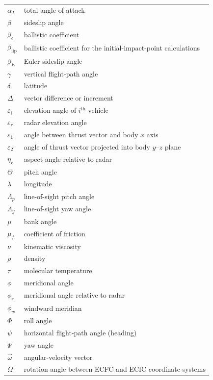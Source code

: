 \begin{longtable}{@{}>{\raggedleft\arraybackslash}p{}p{}@{}}
$\alpha_T$ & total angle of attack \\
$\beta$ & sideslip angle \\
$\beta_c$ & ballistic coefficient \\
$\beta_{\mathrm{iip}}$ & ballistic coefficient for the initial-impact-point calculations \\
$\beta_E$ & Euler sideslip angle \\
$\gamma$ & vertical flight-path angle \\
$\delta$ & latitude \\
$\Delta$ & vector difference or increment \\
$\varepsilon_i$ & elevation angle of $i^{\mathrm{th}}$ vehicle \\
$\varepsilon_r$ & radar elevation angle \\
$\varepsilon_1$ & angle between thrust vector and body $x$ axis \\
$\varepsilon_2$ & angle of thrust vector projected into body $y$--$z$ plane \\
$\eta_r$ & aspect angle relative to radar \\
$\Theta$ & pitch angle \\
$\lambda$ & longitude \\
$\Lambda_p$ & line-of-sight pitch angle \\
$\Lambda_y$ & line-of-sight yaw angle \\
$\mu$ & bank angle \\
$\mu_f$ & coefficient of friction \\
$\nu$ & kinematic viscosity \\
$\rho$ & density \\
$\tau$ & molecular temperature \\
$\phi$ & meridional angle \\
$\phi_r$ & meridional angle relative to radar \\
$\phi_w$ & windward meridian \\
$\Phi$ & roll angle \\
$\psi$ & horizontal flight-path angle (heading) \\
$\Psi$ & yaw angle \\
$\vec{\omega}$ & angular-velocity vector \\
$\Omega$ & rotation angle between ECFC and ECIC coordinate systems \\
\end{longtable}
\endgroup

